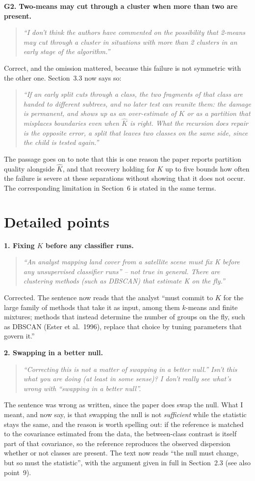 \documentclass[11pt]{article}
\newcommand{\R}[1]{\medskip\noindent\textbf{#1}\quad}
\newenvironment{rquote}{\begin{quote}\itshape}{\end{quote}}
\begin{document}
\R{G2. Two-means may cut through a cluster when more than two are present.}
\begin{rquote}
``I don't think the authors have commented on the possibility that 2-means may
cut through a cluster in situations with more than 2 clusters in an early stage
of the algorithm.''
\end{rquote}
Correct, and the omission mattered, because this failure is not symmetric with
the other one. Section~3.3 now says so:
\begin{rquote}
``If an early split cuts through a class, the two fragments of that class are
handed to different subtrees, and no later test can reunite them: the damage is
permanent, and shows up as an over-estimate of $K$ or as a partition that
misplaces boundaries even when $\hat K$ is right. What the recursion does
repair is the opposite error, a split that leaves two classes on the same side,
since the child is tested again.''
\end{rquote}
The passage goes on to note that this is one reason the paper reports partition
quality alongside $\hat K$, and that recovery holding for $K$ up to five bounds
how often the failure is severe at these separations without showing that it
does not occur. The corresponding limitation in Section~6 is stated in the same
terms.

\section*{Detailed points}

\R{1. Fixing $K$ before any classifier runs.}
\begin{rquote}
``An analyst mapping land cover from a satellite scene must fix K before any
unsupervised classifier runs'' -- not true in general. There are clustering
methods (such as DBSCAN) that estimate K on the fly.''
\end{rquote}
Corrected. The sentence now reads that the analyst ``must commit to $K$ for the
large family of methods that take it as input, among them $k$-means and finite
mixtures; methods that instead determine the number of groups on the fly, such
as DBSCAN (Ester et al.\ 1996), replace that choice by tuning parameters that
govern it.''

\R{2. Swapping in a better null.}
\begin{rquote}
``Correcting this is not a matter of swapping in a better null.'' Isn't this
what you are doing (at least in some sense)? I don't really see what's wrong
with ``swapping in a better null''.
\end{rquote}
The sentence was wrong as written, since the paper does swap the null. What I
meant, and now say, is that swapping the null is not \emph{sufficient} while
the statistic stays the same, and the reason is worth spelling out: if the
reference is matched to the covariance estimated from the data, the
between-class contrast is itself part of that covariance, so the reference
reproduces the observed dispersion whether or not classes are present. The text
now reads ``the null must change, but so must the statistic'', with the
argument given in full in Section~2.3 (see also point~9).
\end{document}
